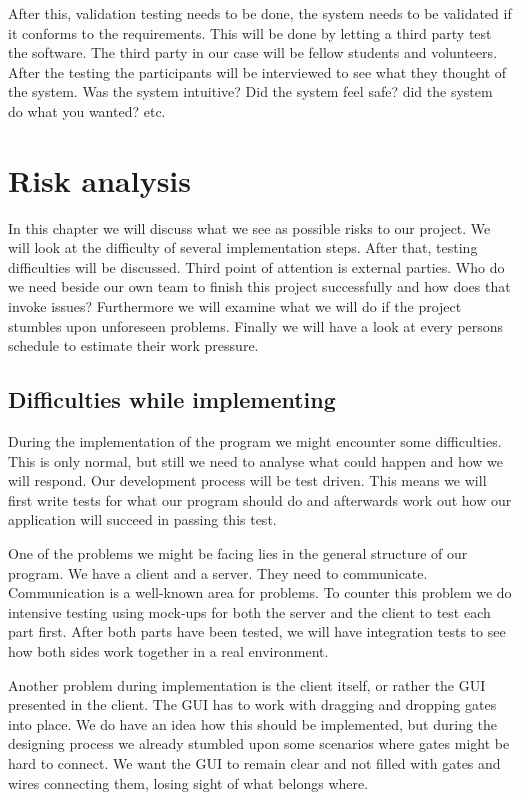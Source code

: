 \documentclass[a4paper]{article}
\begin{document}

\noindent After this, validation testing needs to be done, the system needs to be validated if it conforms to the requirements. This will be done by letting a third party test the software. The third party in our case will be fellow students and volunteers. After the testing the participants will be interviewed to see what they thought of the system. Was the system intuitive? Did the system feel safe? did the system do what you wanted? etc.

\section{Risk analysis}
In this chapter we will discuss what we see as possible risks to our project. We will look at the difficulty of several implementation steps. After that, testing difficulties will be discussed. Third point of attention is external parties. Who do we need beside our own team to finish this project successfully and how does that invoke issues? Furthermore we will examine what we will do if the project stumbles upon unforeseen problems. Finally we will have a look at every persons schedule to estimate their work pressure.

\subsection{Difficulties while implementing}
During the implementation of the program we might encounter some difficulties. This is only normal, but still we need to analyse what could happen and how we will respond. Our development process will be test driven. This means we will first write tests for what our program should do and afterwards work out how our application will succeed in passing this test.
 
One of the problems we might be facing lies in the general structure of our program. We have a client and a server. They need to communicate. Communication is a well-known area for problems. To counter this problem we do intensive testing using mock-ups for both the server and the client to test each part first. After both parts have been tested, we will have integration tests to see how both sides work together in a real environment. 

Another problem during implementation is the client itself, or rather the GUI presented in the client. The GUI has to work with dragging and dropping gates into place. We do have an idea how this should be implemented, but during the designing process we already stumbled upon some scenarios where gates might be hard to connect. We want the GUI to remain clear and not filled with gates and wires connecting them, losing sight of what belongs where.
\end{document}
